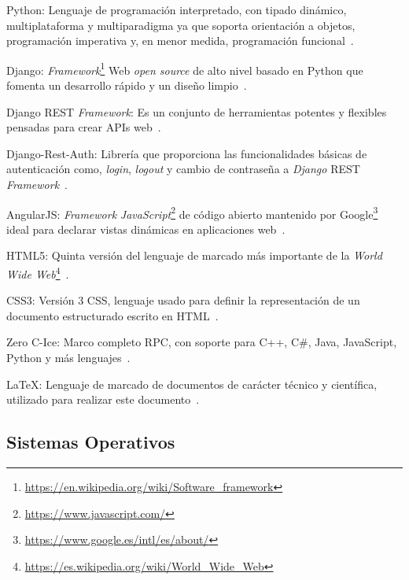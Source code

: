 \begin{definitionlist}
\item[Python:] Lenguaje de programación interpretado, con tipado dinámico, multiplataforma y multiparadigma ya que soporta orientación a objetos, programación imperativa y, en menor medida, programación funcional~\cite{Python}.
\item[Django:] \textit{Framework}\footnote{\url{https://en.wikipedia.org/wiki/Software_framework}} Web \textit{open source} de alto nivel basado en Python que fomenta un desarrollo rápido y un diseño limpio~\cite{Django}.
\item[Django \acs{REST} \textit{Framework}:] Es un conjunto de herramientas potentes y flexibles pensadas para crear \acs{API}s web~\cite{RestFramework}.
\item[Django-Rest-Auth:] Librería que proporciona las funcionalidades básicas de autenticación como, \textit{login}, \textit{logout} y cambio de contraseña a \textit{Django} \acs{REST} \textit{Framework}~\cite{RestAuth}.
\item[AngularJS:] \textit{Framework} \textit{JavaScript}\footnote{\url{https://www.javascript.com/}} de código abierto mantenido por Google\footnote{\url{https://www.google.es/intl/es/about/}} ideal para declarar vistas dinámicas en aplicaciones web~\cite{AngularJS}.
\item[\acs{HTML5}:] Quinta versión del lenguaje de marcado más importante de la \textit{World Wide Web}\footnote{\url{https://es.wikipedia.org/wiki/World_Wide_Web}}~\cite{HTML5}.
\item[\acs{CSS3}:] Versión 3 \acs{CSS}, lenguaje usado para definir la representación de un documento estructurado escrito en \acs{HTML}~\cite{CSS3}.
\item[Zero C-Ice:] Marco completo \acs{RPC}, con soporte para C++, C\#, Java, JavaScript, Python y más lenguajes~\cite{ZeroC}.
\item[\LaTeX:] Lenguaje de marcado de documentos de carácter técnico y científica, utilizado para realizar este documento~\cite{Latex}.
\end{definitionlist}


\subsection{Sistemas Operativos}


